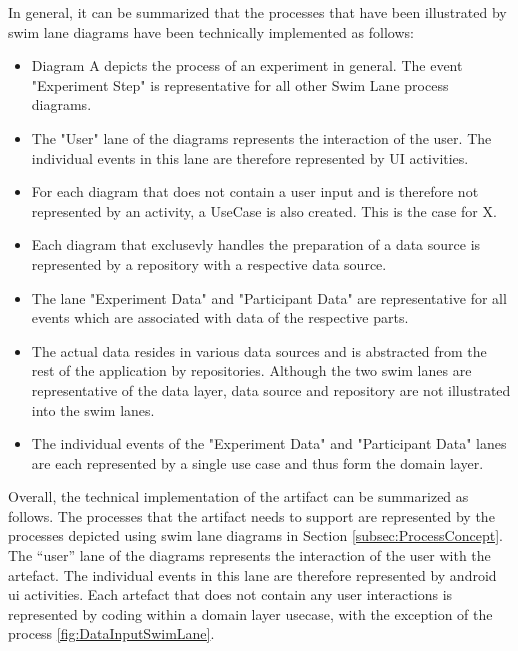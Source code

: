In general, it can be summarized that the processes that have been illustrated by swim lane diagrams have been technically implemented as follows:
\begin{itemize}
    \item Diagram A depicts the process of an experiment in general. The event "Experiment Step" is representative for all other Swim Lane process diagrams.
    \item The "User" lane of the diagrams represents the interaction of the user. The individual events in this lane are therefore represented by UI activities.
    \item For each diagram that does not contain a user input and is therefore not represented by an activity, a UseCase is also created. This is the case for X.
    \item Each diagram that exclusevly handles the preparation of a data source is represented by a repository with a respective data source.
    \item The lane "Experiment Data" and "Participant Data" are representative for all events which are associated with data of the respective parts. 
    \item The actual data resides in various data sources and is abstracted from the rest of the application by repositories. Although the two swim lanes are representative of the data layer, data source and repository are not illustrated into the swim lanes.
    \item The individual events of the "Experiment Data" and "Participant Data" lanes are each represented by a single use case and thus form the domain layer.
\end{itemize}

Overall, the technical implementation of the artifact can be summarized as follows. The processes that the artifact needs to support are represented by the processes depicted using swim lane diagrams in Section \ref{subsec:ProcessConcept}. The \enquote{user} lane of the diagrams represents the interaction of the user with the artefact. The individual events in this lane are therefore represented by android \ac{ui} activities. Each artefact that does not contain any user interactions is represented by coding within a domain layer usecase, with the exception of the process \ref{fig:DataInputSwimLane}.  







